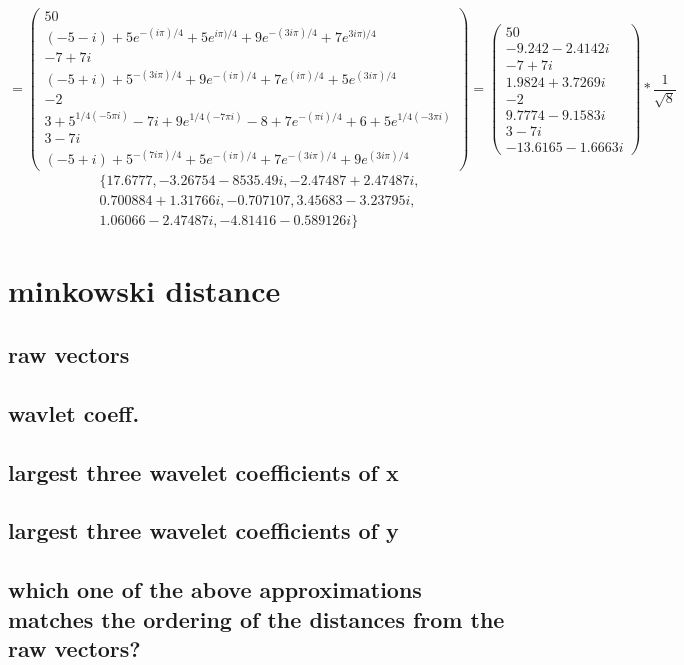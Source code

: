 \documentclass{article}
\begin{document}
\[
	=
	\begin{pmatrix}
	  50 \\
	  (-5-i)+5 e^{-(i \pi)/4}+5 e^{ i \pi)/4}+9 e^{-(3 i \pi)/4}+7 e^{3 i \pi)/4} \\
	  -7 + 7i \\
	  (-5+i)+5^{-(3 i \pi)/4}+9 e^{-(i \pi)/4}+7 e^{(i \pi)/4}+5 e^{(3 i \pi)/4} \\
	  -2 \\
	  3+5^{1/4 (-5 \pi i)}-7 i+9 e^{1/4 (-7 \pi i)}-8+7 e^{-(\pi i)/4}+6+5 e^{1/4 (-3 \pi i)} \\
	  3 - 7i \\
	  (-5+i)+5^{-(7 i \pi)/4}+5 e^{-(i \pi)/4}+7 e^{-(3 i \pi)/4}+9 e^{(3 i \pi)/4}

	\end{pmatrix}
	=
	\begin{pmatrix}
	  50 \\
	  -9.242 - 2.4142 i \\
	  -7 + 7i \\
	  1.9824 + 3.7269 i \\
	  -2 \\
	  9.7774 - 9.1583 i \\
	  3 - 7i \\
	  -13.6165 - 1.6663 i

	\end{pmatrix}
	*
   \frac{1}{\sqrt{8}} 
\]
\begin{align*}
  \{ 17.6777, -3.26754-8535.49 i, -2.47487+2.47487 i,\\
  0.700884+1.31766 i, -0.707107, 3.45683-3.23795 i, \\
  1.06066-2.47487 i, -4.81416-0.589126 i \}
\end{align*}

\section{minkowski distance}

\subsection{raw vectors}


\subsection{wavlet coeff.}


\subsection{largest three wavelet coefficients of x}


\subsection{largest three wavelet coefficients of y}


\subsection{which one of the above approximations matches the ordering of the distances from 
the raw vectors?}
\end{document}
